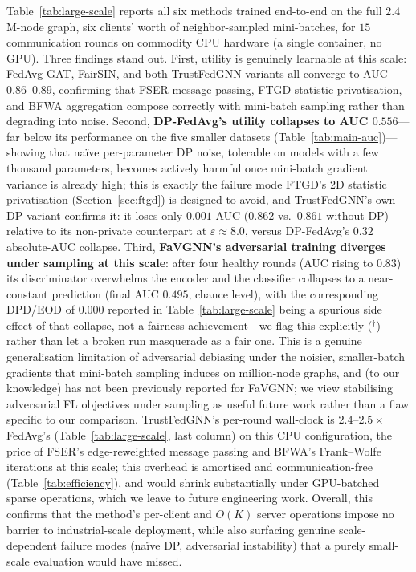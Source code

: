 \documentclass[pdflatex,sn-mathphys-num]{sn-jnl}
\theoremstyle{thmstyleone}%
\theoremstyle{thmstyletwo}%
\theoremstyle{thmstylethree}%
\begin{document}
Table~\ref{tab:large-scale} reports all six methods trained end-to-end on the
full $2.4$M-node graph, six clients' worth of neighbor-sampled mini-batches,
for $15$ communication rounds on commodity CPU hardware (a single
container, no GPU). Three findings stand out. First, utility is genuinely
learnable at this scale: FedAvg-GAT, FairSIN, and both TrustFedGNN variants all
converge to AUC $0.86$--$0.89$, confirming that FSER message passing, FTGD
statistic privatisation, and BFWA aggregation compose correctly with
mini-batch sampling rather than degrading into noise. Second,
\textbf{DP-FedAvg's utility collapses to AUC $0.556$}---far below its
performance on the five smaller datasets (Table~\ref{tab:main-auc})---showing
that naïve per-parameter DP noise, tolerable on models with a few thousand
parameters, becomes actively harmful once mini-batch gradient variance is
already high; this is exactly the failure mode FTGD's 2D statistic
privatisation (Section~\ref{sec:ftgd}) is designed to avoid, and TrustFedGNN's
own DP variant confirms it: it loses only $0.001$ AUC ($0.862$ vs.\ $0.861$
without DP) relative to its non-private counterpart at $\varepsilon\approx 8.0$,
versus DP-FedAvg's $0.32$ absolute-AUC collapse. Third,
\textbf{FaVGNN's adversarial training diverges under sampling at this scale}:
after four healthy rounds (AUC rising to $0.83$) its discriminator overwhelms
the encoder and the classifier collapses to a near-constant prediction (final
AUC $0.495$, chance level), with the corresponding DPD/EOD of $0.000$ reported
in Table~\ref{tab:large-scale} being a spurious side effect of that collapse,
not a fairness achievement---we flag this explicitly ($^{\dagger}$) rather
than let a broken run masquerade as a fair one. This is a genuine
generalisation limitation of adversarial debiasing under the noisier,
smaller-batch gradients that mini-batch sampling induces on million-node
graphs, and (to our knowledge) has not been previously reported for FaVGNN;
we view stabilising adversarial FL objectives under sampling as useful future
work rather than a flaw specific to our comparison. TrustFedGNN's per-round
wall-clock is $2.4$--$2.5\times$ FedAvg's (Table~\ref{tab:large-scale},
last column) on this CPU configuration, the price of FSER's edge-reweighted
message passing and BFWA's Frank--Wolfe iterations at this scale; this
overhead is amortised and communication-free (Table~\ref{tab:efficiency}), and
would shrink substantially under GPU-batched sparse operations, which we
leave to future engineering work. Overall, this confirms that the method's
per-client and $O(K)$ server operations impose no barrier to industrial-scale
deployment, while also surfacing genuine scale-dependent failure modes
(naïve DP, adversarial instability) that a purely small-scale evaluation
would have missed.
\end{document}
